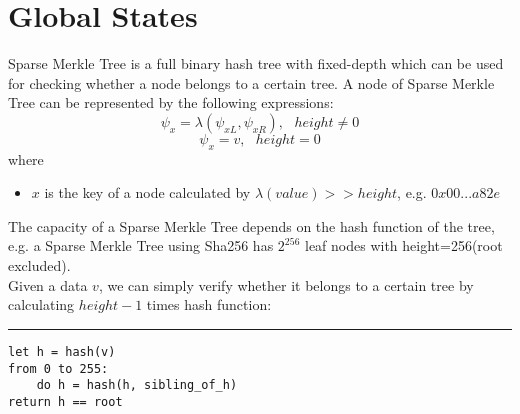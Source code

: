 \documentclass[a4paper,12pt]{article}
\begin{document}
\section{Global States}
\label{sec:org9b71832}
Sparse Merkle Tree is a full binary hash tree with fixed-depth which can be used for checking whether a node belongs to a certain tree. A node of Sparse Merkle Tree can be represented by the following expressions:\\
\begin{equation*}
    \psi_{x} = \lambda(\psi_{xL}, \psi_{xR}), \text{ } height \ne 0
\end{equation*}
\begin{equation*}
    \psi_{x} = v, \text{ } height = 0
\end{equation*}
where\\
\begin{itemize}
    \item $x$ is the key of a node calculated by $\lambda(value) >> height$, e.g. $0x00...a82e$
\end{itemize}
The capacity of a Sparse Merkle Tree depends on the hash function of the tree, e.g. a Sparse Merkle Tree using Sha256 has \(2^{256}\) leaf nodes with height=256(root excluded).\\
Given a data \(v\), we can simply verify whether it belongs to a certain tree by calculating \(height-1\) times hash function:\\

\noindent\rule{\textwidth}{0.5pt}
\begin{verbatim}
let h = hash(v)
from 0 to 255:
    do h = hash(h, sibling_of_h)
return h == root
\end{verbatim}
\end{document}
